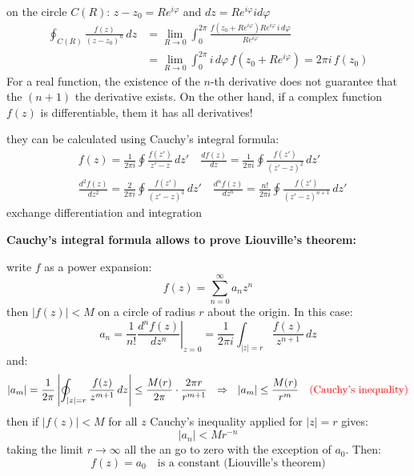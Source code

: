 \documentclass{article}
\begin{document}
\noindent
on the circle $C(R)$: $z-z_0 = Re^{i\varphi}$ and $dz = Re^{i \varphi} id\varphi$
\begin{align}
    \oint_{C(R)} \frac{f(z)}{(z - z_0)^n} \, dz
&= \lim_{R \to 0} \int_{0}^{2\pi}
\frac{f(z_0 + R e^{i\varphi}) R e^{i\varphi} \, i \, d\varphi}{R e^{i\varphi}}\\
&= \lim_{R \to 0} \int_{0}^{2\pi} i \, d\varphi \, f(z_0 + R e^{i\varphi})
= 2\pi i \, f(z_0)
\end{align}
For a real function, the existence of the $n$-th derivative does not guarantee that the $(n+1)$ the derivative exists. On the other hand, if a complex function $f(z)$ is differentiable, them it has all derivatives!

\noindent
they can be calculated using Cauchy’s integral formula:
\begin{align*}
    &f(z) = \frac{1}{2\pi i} \oint \frac{f(z')}{z' - z} \, dz' \quad  \frac{d f(z)}{d z} = \frac{1}{2\pi i} \oint \frac{f(z')}{(z' - z)^2} \, dz'\\
    &\frac{d^2 f(z)}{d z^2} = \frac{2}{2\pi i} \oint \frac{f(z')}{(z' - z)^3} \, dz' \quad \frac{d^n f(z)}{d z^n} = \frac{n!}{2\pi i} \oint \frac{f(z')}{(z' - z)^{n+1}} \, dz'
\end{align*}
exchange differentiation and integration
\newpage

\noindent
\textbf{Cauchy’s integral formula allows to prove Liouville’s theorem:}

\begin{center}
\end{center}

\noindent
write $f$ as a power expansion:
\begin{equation}
    f(z) = \sum_{n=0}^\infty a_n z^n
\end{equation}
then $|f(z)|<M$ on a circle of radius $r$ about the origin. In this case:
\begin{equation}
    a_n = \frac{1}{n!} \left. \frac{d^n f(z)}{d z^n} \right|_{z = 0}
= \frac{1}{2\pi i} \int_{|z| = r} \frac{f(z)}{z^{n+1}} \, dz
\end{equation}
and:
\begin{equation}
    |a_m| = \frac{1}{2\pi} \left|  \oint_{|z| = r} \frac{f(z)}{z^{m+1}} \, dz \right|
\leq \frac{M(r)}{2\pi} \cdot \frac{2\pi r}{r^{m+1}}  \  \ \Rightarrow \ \ 
|a_m| \leq \frac{M(r)}{r^m} \quad \color{red} \text{(Cauchy's inequality)} \color{black}
\end{equation}
then if $|f(z)|<M$ for all $z$ Cauchy’s inequality applied for $|z|=r$ gives:
\begin{equation}
    |a_n| < Mr^{-n}
\end{equation}
taking the limit $r \rightarrow \infty$ all the an go to zero with the exception of $a_0$. Then:
\begin{equation}
    f(z) = a_0  \quad \text{is a constant (Liouville’s theorem)}
\end{equation}
\end{document}

